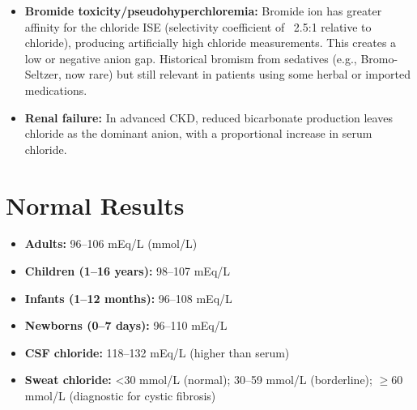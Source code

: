 \begin{itemize}
  \item \textbf{Bromide toxicity/pseudohyperchloremia:} Bromide ion has greater affinity for the chloride ISE (selectivity coefficient of ~2.5:1 relative to chloride), producing artificially high chloride measurements. This creates a low or negative anion gap. Historical bromism from sedatives (e.g., Bromo-Seltzer, now rare) but still relevant in patients using some herbal or imported medications.
  \item \textbf{Renal failure:} In advanced CKD, reduced bicarbonate production leaves chloride as the dominant anion, with a proportional increase in serum chloride.
\end{itemize}

\section*{Normal Results}
\begin{itemize}
  \item \textbf{Adults:} 96--106 mEq/L (mmol/L) \cite{fischbach2023manual}
  \item \textbf{Children (1--16 years):} 98--107 mEq/L
  \item \textbf{Infants (1--12 months):} 96--108 mEq/L
  \item \textbf{Newborns (0--7 days):} 96--110 mEq/L
  \item \textbf{CSF chloride:} 118--132 mEq/L (higher than serum)
  \item \textbf{Sweat chloride:} <30 mmol/L (normal); 30--59 mmol/L (borderline); $\geq$60 mmol/L (diagnostic for cystic fibrosis)
\end{itemize}

